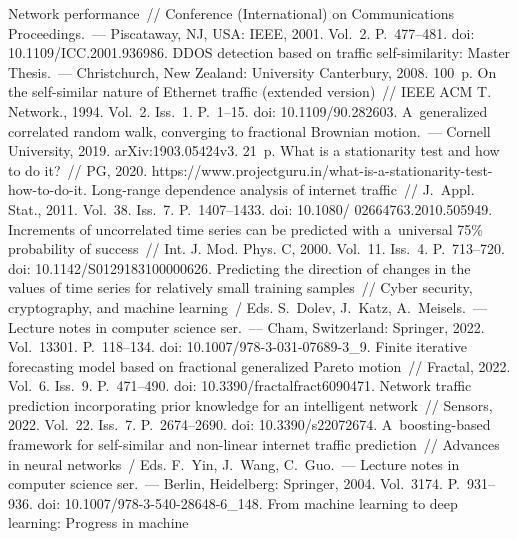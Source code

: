 \begin{multicols}{2}
{{\begin{thebibliography}{99}
Network performance~//  Conference (International) on Communications Proceedings.~--- Piscataway, NJ, USA: IEEE, 2001. Vol.~2. 
P.~477--481. doi: 10.1109/ICC.2001.936986.
 DDOS detection based on traffic self-similarity: Master Thesis.~--- Christchurch, 
New Zealand: University Canterbury, 2008. 100~p.
 On the self-similar nature of 
Ethernet traffic (extended version)~// IEEE ACM T. Network., 
1994. Vol.~2. Iss.~1. P.~1--15. doi: 10.1109/90.282603.
 A~generalized correlated random walk, 
converging to fractional Brownian motion.~--- Cornell University, 2019. arXiv:1903.05424v3. 21~p.
 What is a stationarity test and how to do it?~// PG, 2020. 
{\sf https://www.projectguru.in/what-is-a-stationarity-test-how-to-do-it}.
 Long-range dependence analysis of internet 
traffic~// J.~Appl. Stat., 2011. Vol.~38. Iss.~7. P.~1407--1433. doi: 10.1080/ 02664763.2010.505949.
 Increments of uncorrelated time series can be predicted with 
a~universal 75\% probability of success~// Int. J. Mod. Phys. C, 2000. Vol.~11. Iss.~4.  
P.~713--720. doi: 10.1142/S0129183100000626.
 Predicting the direction of changes in the values of time series for relatively 
small training samples~// Cyber security, cryptography, and machine learning~/
Eds. S.~Dolev, J.~Katz, 
A.~Meisels.~--- Lecture notes in computer science  
ser.~--- Cham, Switzerland: Springer, 2022. Vol.~13301. P.~118--134.  
doi: 10.1007/978-3-031-07689-3\_9. 
 Finite iterative forecasting model 
based on fractional generalized Pareto motion~// Fractal, 2022. Vol.~6. Iss.~9. P.~471--490.
doi: 10.3390/fractalfract6090471.
 Network traffic prediction incorporating prior 
knowledge for an intelligent network~// Sensors, 2022. Vol.~22. Iss.~7. P.~2674--2690.
doi: 10.3390/s22072674.
 A~boosting-based framework for self-similar and non-linear internet 
traffic prediction~// Advances in neural networks~/ Eds. F.~Yin, J.~Wang, 
C.~Guo.~--- Lecture notes in computer science ser.~--- Berlin, Heidelberg: Springer, 
2004. Vol.~3174. P.~931--936. doi: 10.1007/978-3-540-28648-6\_148.
 From machine learning to deep learning: Progress in machine 

\end{thebibliography}}}
\end{multicols}

